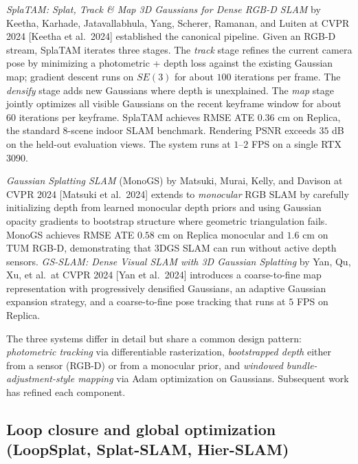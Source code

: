 \emph{SplaTAM: Splat, Track \& Map 3D Gaussians for Dense RGB-D SLAM} by Keetha, Karhade, Jatavallabhula, Yang, Scherer, Ramanan, and Luiten at CVPR 2024 {[}Keetha et al.~2024{]} established the canonical pipeline. Given an RGB-D stream, SplaTAM iterates three stages. The \emph{track} stage refines the current camera pose by minimizing a photometric + depth loss against the existing Gaussian map; gradient descent runs on \(SE(3)\) for about \(100\) iterations per frame. The \emph{densify} stage adds new Gaussians where depth is unexplained. The \emph{map} stage jointly optimizes all visible Gaussians on the recent keyframe window for about \(60\) iterations per keyframe. SplaTAM achieves RMSE ATE \(0.36\) cm on Replica, the standard \(8\)-scene indoor SLAM benchmark. Rendering PSNR exceeds \(35\) dB on the held-out evaluation views. The system runs at \(1\)--\(2\) FPS on a single RTX 3090.

\emph{Gaussian Splatting SLAM} (MonoGS) by Matsuki, Murai, Kelly, and Davison at CVPR 2024 {[}Matsuki et al.~2024{]} extends to \emph{monocular} RGB SLAM by carefully initializing depth from learned monocular depth priors and using Gaussian opacity gradients to bootstrap structure where geometric triangulation fails. MonoGS achieves RMSE ATE \(0.58\) cm on Replica monocular and \(1.6\) cm on TUM RGB-D, demonstrating that 3DGS SLAM can run without active depth sensors. \emph{GS-SLAM: Dense Visual SLAM with 3D Gaussian Splatting} by Yan, Qu, Xu, et al.~at CVPR 2024 {[}Yan et al.~2024{]} introduces a coarse-to-fine map representation with progressively densified Gaussians, an adaptive Gaussian expansion strategy, and a coarse-to-fine pose tracking that runs at \(5\) FPS on Replica.

The three systems differ in detail but share a common design pattern: \emph{photometric tracking} via differentiable rasterization, \emph{bootstrapped depth} either from a sensor (RGB-D) or from a monocular prior, and \emph{windowed bundle-adjustment-style mapping} via Adam optimization on Gaussians. Subsequent work has refined each component.

\subsection{Loop closure and global optimization (LoopSplat, Splat-SLAM, Hier-SLAM)}\label{loop-closure-and-global-optimization-loopsplat-splat-slam-hier-slam}

